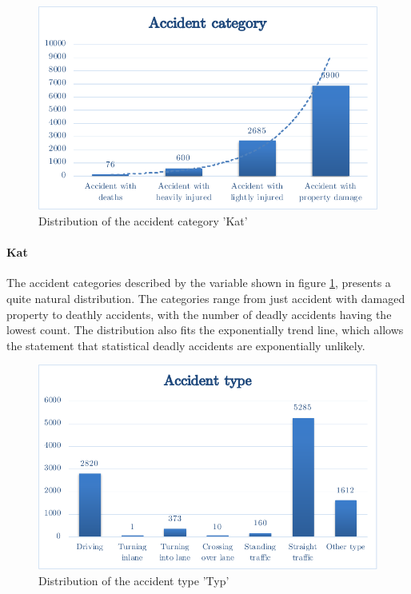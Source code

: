 \documentclass[a4paper,12pt]{report}
\begin{document}
\begin{figure}[h]
	\centering
	\includegraphics[scale=0.6]{./assets/baysis_dataset_Kat.pdf}
	\caption{Distribution of the accident category 'Kat'}
	\label{img:baysis_dataset_Kat}
\end{figure}

\paragraph{Kat}
The accident categories described by the variable shown in figure \ref{img:baysis_dataset_Kat}, presents a quite natural distribution. The categories range from just accident with damaged property to deathly accidents, with the number of deadly accidents having the lowest count. The distribution also fits the exponentially trend line, which allows the statement that statistical deadly accidents are exponentially unlikely.

\begin{figure}[h]
	\centering
	\includegraphics[scale=0.6]{./assets/baysis_dataset_Typ.pdf}
	\caption{Distribution of the accident type 'Typ'}
	\label{img:baysis_dataset_Typ}
\end{figure}
\end{document}
